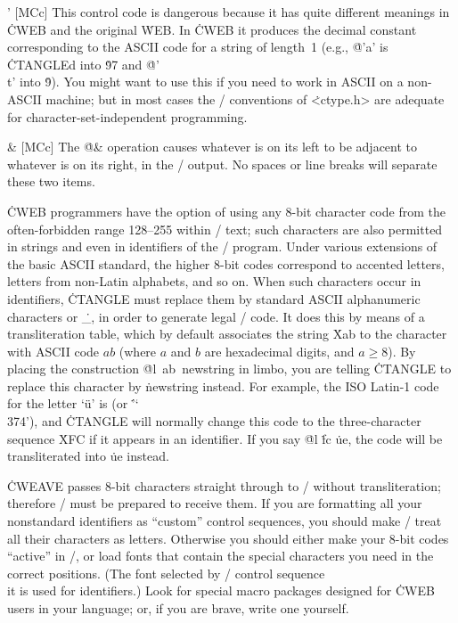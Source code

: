 \@' [MCc] This control code is dangerous because it has quite different
meanings in \.{CWEB} and the original \.{WEB}. In \.{CWEB} it produces the
decimal constant corresponding to the ASCII code for a string of length~1
(e.g., \.{@'a'} is \.{CTANGLE}d into \.{97} and \.{@'\\t'} into
\.9). You might want to use this if you need to work in ASCII on a
non-ASCII machine; but in most cases the \CEE/ conventions of
\.{<ctype.h>} are adequate for character-set-independent programming.

\@\& [MCc] The \.{@\&} operation causes whatever is on its left to be
adjacent to whatever is on its right, in the \CEE/ output. No spaces or
line breaks will separate these two items.

\@l [L] \.{CWEB} programmers have the option of using any 8-bit character
code from the often-forbidden range 128--255 within \TEX/ text; such
characters are also permitted in strings and even in identifiers of the
\CEE/ program.
Under various extensions of the basic
ASCII standard, the higher 8-bit codes correspond
to accented letters, letters from non-Latin alphabets,
and so on. When such characters occur in identifiers, \.{CTANGLE} must replace
them by standard ASCII alphanumeric characters or
\.{\_}, in order to generate legal \CEE/ code.  It does this by means
of a transliteration table, which by default associates the string
\.{Xab} to the character with ASCII code \T{\^}$ab$ (where $a$ and $b$ are
hexadecimal digits, and $a\ge8$).  By placing the
construction \.{@l\ ab\ newstring} in limbo, you are telling
\.{CTANGLE} to replace this character by \.{newstring} instead.
For example, the ISO Latin-1 code for the letter `\"u' is 
(or \.{'\char`\\374'}),
and \.{CTANGLE} will normally change this code to the
three-character sequence \.{XFC} if it
appears in an identifier. If you say \.{@l} \.{fc} \.{ue}, the code will
be transliterated into \.{ue} instead.

\more
\.{CWEAVE} passes 8-bit characters straight through to \TEX/ without
transliteration; therefore \TEX/ must be prepared to receive them.
If you are formatting all your nonstandard identifiers as ``custom''
control sequences, you should
make \TEX/ treat all their characters as letters. Otherwise you should either
make your 8-bit codes ``active'' in \TEX/, or load fonts that
contain the special characters you need in the correct positions.
(The font selected by \TEX/ control sequence \.{\\it} is used for
identifiers.)
Look for special macro packages designed for \.{CWEB} users in your language;
or, if you are brave, write one yourself.

